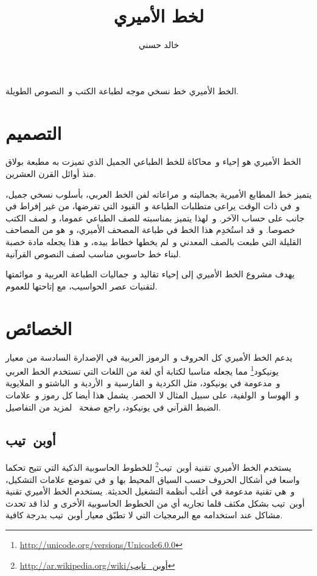 \documentclass[a4paper]{article}
\title{\titlefont {\addfontfeatures{CharacterVariant=1}ا}لخط الأمير{\addfontfeatures{CharacterVariant=1}ي}}
\author{خالد حسني}
\begin{document}
\pagecolor{pagecolor}
\color{textcolor}

\maketitle
\tableofcontents
\newpage


الخط الأميري خط نسخي موجه لطباعة الكتب و النصوص الطويلة.

\section{التصميم}
الخط الأميري هو إحياء و محاكاة للخط الطباعي الجميل الذي تميزت به مطبعة
بولاق منذ أوائل القرن العشرين.

يتميز خط المطابع الأميرية بجماليته و مراعاته لفن الخط العربي، بأسلوب
نسخي جميل، و في ذات الوقت يراعى متطلبات الطباعة و القيود التي تفرضها، من
غير إفراط في جانب على حساب الآخر. و لهذا يتميز بمناسبته للصف الطباعي
عموما، و لصف الكتب خصوصا. و قد استُخدِم هذا الخط في طباعة المصحف
الأميري، و هو من المصاحف القليلة التي طبعت بالصف المعدني و لم يخطها خطاط
بيده، و هذا يجعله مادة خصبة لبناء خط حاسوبي مناسب لصف النصوص القرآنية.

يهدف مشروع الخط الأميري إلى إحياء تقاليد و جماليات الطباعة العربية
و موائمتها لتقنيات عصر الحواسيب، مع إتاحتها للعموم.

\section{الخصائص}
يدعم الخط الأميري كل الحروف و الرموز العربية في الإصدارة السادسة من
معيار يونيكود\footnote{\url{http://unicode.org/versions/Unicode6.0.0}}
مما يجعله مناسبا لكتابة أي لغة من اللغات التي تستخدم الخط العربي
و مدعومة في يونيكود، مثل الكردية و الفارسية و الأردية و الباشتو
و الملايوية و الهوسا و الولفية، على سبيل المثال لا الحصر. يشمل هذا أيضا
كل رموز و علامات الضبط القرآني في يونيكود، راجع
صفحة \pageref{ref:quranic-text} لمزيد من التفاصيل.

\subsection{أوبن تيب}
يستخدم الخط الأميري تقنية
أوبن تيب\footnote{\url{http://ar.wikipedia.org/wiki/أوبن_تايب}} للخطوط
الحاسوبية الذكية التي تتيح تحكما واسعا في أشكال الحروف حسب السياق المحيط
بها و في تموضع علامات التشكيل، و هي تقنية مدعومة في أغلب أنظمة التشغيل
الحديثة. يستخدم الخط الأميري تقنية أوبن تيب بشكل مكثف قلما تجاريه أي من
الخطوط الحاسوبية الأخرى و لذا قد تحدث مشاكل عند استخدامه مع البرمجيات
التي لا تطبّق معيار أوبن تيب بدرجة كافية.
\end{document}

